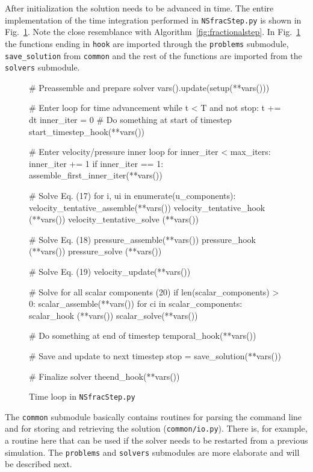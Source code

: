 \documentclass[final,3p,times,twocolumn]{elsarticle}
\newcommand{\inpyth}{\lstinline[style=inlinestyle]} %[]%
\newcounter{bla}
\begin{document}
After initialization the solution needs to be advanced in time. The entire implementation of the time integration performed in \inpyth{NSfracStep.py} is shown in Fig.~\ref{fig:timeloop}. Note the close resemblance with Algorithm~\ref{fig:fractionalstep}. In Fig.~\ref{fig:timeloop} the functions ending in \inpyth{hook}{} are imported through the \inpyth{problems} submodule, \inpyth{save_solution} from \inpyth{common} and the rest of the functions are imported from the \inpyth{solvers} submodule.
\begin{figure}[ht!]
\begin{python}
# Preassemble and prepare solver
vars().update(setup(**vars()))

# Enter loop for time advancement
while t < T and not stop:
  t += dt
  inner_iter = 0
  # Do something at start of timestep
  start_timestep_hook(**vars())

  # Enter velocity/pressure inner loop
  for inner_iter < max_iters:
    inner_iter += 1
    if inner_iter == 1:
      assemble_first_inner_iter(**vars())

    # Solve Eq. (17)
    for i, ui in enumerate(u_components):
      velocity_tentative_assemble(**vars())
      velocity_tentative_hook    (**vars())
      velocity_tentative_solve   (**vars())

    # Solve Eq. (18)
    pressure_assemble(**vars())
    pressure_hook    (**vars())
    pressure_solve   (**vars())

  # Solve Eq. (19)
  velocity_update(**vars())

  # Solve for all scalar components (20)
  if len(scalar_components) > 0:
    scalar_assemble(**vars())
    for ci in scalar_components:
      scalar_hook (**vars())
      scalar_solve(**vars())

  # Do something at end of timestep
  temporal_hook(**vars())

  # Save and update to next timestep
  stop = save_solution(**vars())

# Finalize solver
theend_hook(**vars())

\end{python}
\caption{Time loop in \inpyth{NSfracStep.py}{}}
\label{fig:timeloop}
\end{figure}

The \inpyth{common} submodule basically contains routines for parsing the command line and for storing and retrieving the solution (\inpyth{common/io.py}{}). There is, for example, a routine here that can be used if the solver needs to be restarted from a previous simulation. The \inpyth{problems} and \inpyth{solvers} submodules are more elaborate and will be described next.
\end{document}
